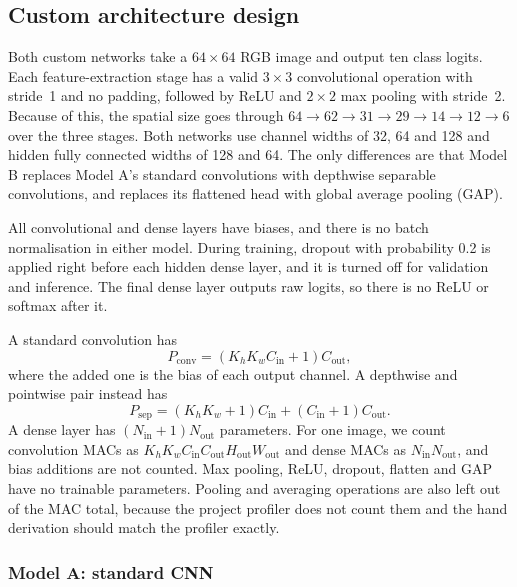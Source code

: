 \subsection{Custom architecture design}
\label{sec:custom-architecture}

Both custom networks take a $64\times64$ RGB image and output ten class
logits.  Each feature-extraction stage has a valid $3\times3$ convolutional
operation with stride~1 and no padding, followed by ReLU and $2\times2$ max
pooling with stride~2.  Because of this, the spatial size goes through
$64\rightarrow62\rightarrow31\rightarrow29\rightarrow14\rightarrow12
\rightarrow6$ over the three stages.  Both networks use channel widths of 32,
64 and 128 and hidden fully connected widths of 128 and 64.  The only
differences are that Model B replaces Model A's standard convolutions with
depthwise separable convolutions, and replaces its flattened head with global
average pooling (GAP).

All convolutional and dense layers have biases, and there is no batch
normalisation in either model.  During training, dropout with probability 0.2
is applied right before each hidden dense layer, and it is turned off for
validation and inference.  The final dense layer outputs raw logits, so there
is no ReLU or softmax after it.

A standard convolution has
\begin{equation}
  P_{\mathrm{conv}}=(K_hK_wC_{\mathrm{in}}+1)C_{\mathrm{out}},
\end{equation}
where the added one is the bias of each output channel.  A depthwise and
pointwise pair instead has
\begin{equation}
  P_{\mathrm{sep}}=(K_hK_w+1)C_{\mathrm{in}}
  +(C_{\mathrm{in}}+1)C_{\mathrm{out}}.
\end{equation}
A dense layer has $(N_{\mathrm{in}}+1)N_{\mathrm{out}}$ parameters.  For one
image, we count convolution MACs as
$K_hK_wC_{\mathrm{in}}C_{\mathrm{out}}H_{\mathrm{out}}W_{\mathrm{out}}$
and dense MACs as $N_{\mathrm{in}}N_{\mathrm{out}}$, and bias additions are
not counted.  Max pooling, ReLU, dropout, flatten and GAP have no trainable
parameters.  Pooling and averaging operations are also left out of the MAC
total, because the project profiler does not count them and the hand
derivation should match the profiler exactly.

\subsubsection{Model A: standard CNN}

